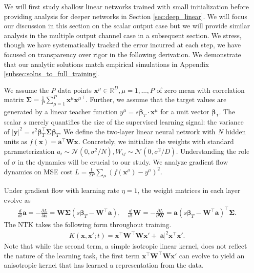 \documentclass{article} %
\def\x{\bm x}
\def\W{\bm W}
\def\d{\partial}
\begin{document}
We will first study shallow linear networks trained with small initialization before providing analysis for deeper networks in Section \ref{sec:deep_linear}. We will focus our discussion in this section on the scalar output case but we will provide similar analysis in the multiple output channel case in a subsequent section.  We stress, though we have systematically tracked the error incurred at each step, we have focused on transparency over rigor in the following derivation. We demonstrate that our analytic solutions match empirical simulations in Appendix \ref{subsec:solns_to_full_training}. 

We assume the $P$ data points $\bm x^\mu \in \mathbb{R}^{D}, \mu = 1, \dots, P$ of zero mean with correlation matrix $\bm\Sigma = \frac1P \sum_{\mu=1}^P \bm x^\mu {\bm x^\mu}^\top$. Further, we  assume that the target values are generated by a linear teacher function $y^\mu = s \bm { \beta}_T \cdot \bm x^{\mu}$ for a unit vector $\bm{ \beta}_T$. The scalar $s$ merely quantifies the size of the supervised learning signal: the variance of $|\bm y|^2 = s^2 \bm\beta^\top_T \bm\Sigma \bm \beta_T$. We define the two-layer linear neural network with $N$ hidden units as $f(\x) = \bm a^\top \bm W \bm x$. Concretely, we initialize the weights with standard parameterization $a_i \sim\mathcal{N}(0,\sigma^2/N), W_{ij} \sim\mathcal{N}(0,\sigma^2/D)$. Understanding the role of $\sigma$ in the dynamics will be crucial to our study. We analyze gradient flow dynamics on MSE cost $L = \frac{1}{2 P} \sum_{\mu} \left( f(\bm x^\mu) - y^\mu  \right)^2$. 

Under gradient flow with learning rate $\eta = 1$, the weight matrices in each layer evolve as
\begin{align}
    \frac{d}{dt} \bm a = - \frac{\d L}{\d \bm a} = \bm W \bm \Sigma \left( s \bm\beta_T - \bm W^\top \bm a \right), \quad
    \frac{d}{dt} \W = - \frac{\d L}{\d \bm W} =  \bm a \left( s \bm \beta_T - \bm W^\top \bm a \right)^\top \bm \Sigma.
\end{align}
The NTK takes the following form throughout training.
\begin{align}\label{eq:kernel_evolution}
    K(\bm x, \bm x'; t) = \bm x^\top \bm W^\top  \bm W \bm x' + |\bm a|^2 \bm x^\top \bm x'.
\end{align}
Note that while the second term, a simple isotropic linear kernel, does not reflect the nature of the learning task, the first term $\bm x^\top \bm W^\top \bm W \bm x'$ can evolve to yield an anisotropic kernel that has learned a representation from the data.  
\end{document}

